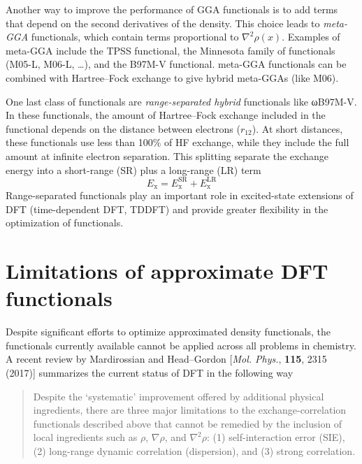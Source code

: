 \documentclass[../Main/chem371-notes.tex]{subfiles}
\begin{document}
Another way to improve the performance of GGA functionals is to add terms that depend on the second derivatives of the density.
This choice leads to \emph{meta-GGA} functionals, which contain terms proportional to $\nabla^2 \rho(x)$.
Examples of meta-GGA include the TPSS functional, the Minnesota family of functionals (M05-L, M06-L, \ldots), and the B97M-V functional.
meta-GGA functionals can be combined with Hartree--Fock exchange to give hybrid meta-GGAs (like M06).

One last class of functionals are \emph{range-separated hybrid} functionals like ωB97M-V.
In these functionals, the amount of Hartree--Fock exchange included in the functional depends on the distance between electrons ($r_{12}$).
At short distances, these functionals use less than 100\% of HF exchange, while they include the full amount at infinite electron separation.
This splitting separate the exchange energy into a short-range (SR) plus a long-range (LR) term
\begin{equation}
E_\mathrm{x} = E_\mathrm{x}^\mathrm{SR} + E_\mathrm{x}^\mathrm{LR}\end{equation}
Range-separated functionals play an important role in excited-state extensions of DFT (time-dependent DFT, TDDFT) and provide greater flexibility in the optimization of functionals.


\section{Limitations of approximate DFT functionals}

Despite significant efforts to optimize approximated density functionals, the functionals currently available cannot be applied across all problems in chemistry.
A recent review by Mardirossian and Head--Gordon [\textit{Mol. Phys.}, \textbf{115}, 2315 (2017)] summarizes the current status of DFT in the following way
\begin{quote}
Despite the `systematic' improvement offered by additional physical ingredients, there are three major limitations to the exchange-correlation functionals described above that cannot be remedied by the inclusion of local ingredients such as $\rho$, $\nabla \rho$, and $\nabla^2 \rho$: (1) self-interaction error (SIE), (2) long-range dynamic correlation (dispersion), and (3) strong correlation.
%
\end{quote}
\end{document}
